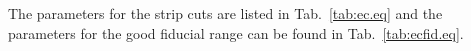 %
%
%
%
%
%
%
%

\FloatBarrier
The parameters for the  strip cuts are listed in Tab.~\ref{tab:ec.eq} and the parameters for the good  fiducial range can be found in Tab.~\ref{tab:ecfid.eq}.



